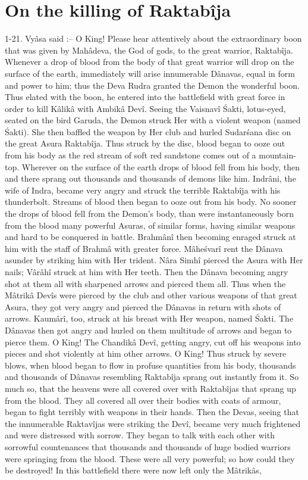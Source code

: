 ﻿\chapter{On the killing of Raktab\^ija}

1-21. Vy\^asa said :-- O King! Please hear attentively about the extraordinary boon that was given by Mah\^adeva, the God of gods, to the great warrior, Raktab\^ija. Whenever a drop of blood from the body of that great warrior will drop on the surface of the earth, immediately will arise innumerable D\^anavas, equal in form and power to him; thus the Deva Rudra granted the Demon the wonderful boon. Thus elated with the boon, he entered into the battlefield with great force in order to kill K\^alik\^a with Ambik\^a Dev\^i. Seeing the Vaisnav\^i \'Sakti, lotus-eyed, seated on the bird Garuda, the Demon struck Her with a violent weapon (named \'Sakti). She then baffled the weapon by Her club and hurled Sudar\'sana disc on the great Asura Raktab\^ija. Thus struck by the disc, blood began to ooze out from his body as the red stream of soft red sandstone comes out of a mountain-top. Wherever on the surface of the earth drops of blood fell from his body, then and there sprang out thousands and thousands of demons like him. Indr\^ani, the wife of Indra, became very angry and struck the terrible Raktab\^ija with his thunderbolt. Streams of blood then began to ooze out from his body. No sooner the drops of blood fell from the Demon's body, than were instantaneously born from the blood many powerful Asuras, of similar forms, having similar weapons and hard to be conquered in battle. Brahm\^an\^i then becoming enraged struck at him with the staff of Brahm\^a with greater force. M\^ahe\'svar\^i rent the D\^anava asunder by striking him with Her trident. N\^ara Simh\^i pierced the Asura with Her nails; V\^ar\^ah\^i struck at him with Her teeth. Then the D\^anava becoming angry shot at them all with sharpened arrows and pierced them all. Thus when the M\^atrik\^a Dev\^is were pierced by the club and other various weapons of that great Asura, they got very angry and pierced the D\^anavas in return with shots of arrows. Kaum\^ar\^i, too, struck at his breast with Her weapon, named \'Sakti. The D\^anavas then got angry and hurled on them multitude of arrows and began to pierce them. O King! The Chandik\^a Dev\^i, getting angry, cut off his weapons into pieces and shot violently at him other arrows. O King! Thus struck by severe blows, when blood began to flow in profuse quantities from his body, thousands and thousands of D\^anavas resembling Raktab\^ija sprang out instantly from it. So much so, that the heavens were all covered over with Raktab\^ijas that sprang up from the blood. They all covered all over their bodies with coats of armour, began to fight terribly with weapons in their hands. Then the Devas, seeing that the innumerable Raktav\^ijas were striking the Dev\^i, became very much frightened and were distressed with sorrow. They began to talk with each other with sorrowful countenances that thousands and thousands of huge bodied warriors were springing from the blood. These were all very powerful; so how could they be destroyed! In this battlefield there were now left only the M\^atrik\^as, 